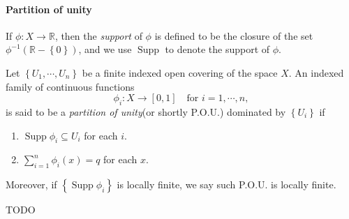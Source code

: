 \paragraph{Partition of unity}

\begin{definition}
  If \( \phi: X \to \mathbb{R} \), then the \emph{support} of \( \phi \) is defined to be the closure of the set \( \phi^{-1}(\mathbb{R} - \left\lbrace 0 \right\rbrace) \), and we use \( \operatorname{Supp} \) to denote the support of \( \phi \).
\end{definition}

\begin{definition}
  Let \( \left\lbrace U_1, \cdots, U_n \right\rbrace \) be a finite indexed open covering of the space \( X \).
  An indexed family of continuous functions
  \[
    \phi_i: X \to [0, 1] \quad \text{for } i = 1,\cdots, n,
  \]
  is said to be a \emph{partition of unity}(or shortly P.O.U.) dominated by \( \left\lbrace U_i \right\rbrace \) if
  \begin{enumerate}
    \item \( \operatorname{Supp} \phi_i \subseteq U_i \) for each \( i \).
    \item \( \sum_{i = 1}^n \phi_i(x) = q \) for each \( x \).
  \end{enumerate}
  Moreover, if \( \left\lbrace \operatorname{Supp} \phi_i \right\rbrace \) is locally finite, we say such P.O.U. is locally finite.
\end{definition}

TODO%

